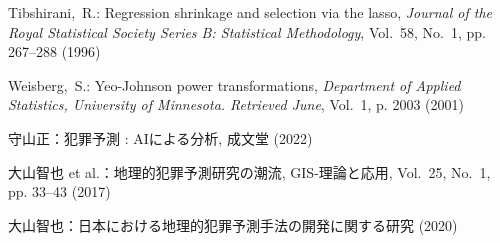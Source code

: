 \begin{thebibliography}{}
  Tibshirani,~R.: Regression shrinkage and selection via the lasso, {\em Journal of the Royal Statistical Society Series B: Statistical Methodology}, Vol.~58, No.~1, pp. 267--288 (1996)
  
  Weisberg,~S.: Yeo-Johnson power transformations, {\em Department of Applied Statistics, University of Minnesota. Retrieved June}, Vol.~1, p. 2003 (2001)
  
  守山正：犯罪予測 : AIによる分析, 成文堂 (2022)
  
  大山智也 et al.：地理的犯罪予測研究の潮流, GIS-理論と応用, Vol.~25, No.~1, pp. 33--43 (2017)
  
  大山智也：日本における地理的犯罪予測手法の開発に関する研究 (2020)
  
  \end{thebibliography}
  